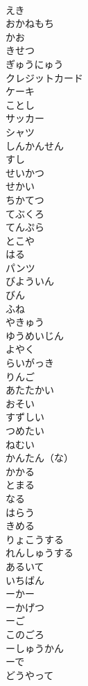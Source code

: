 \documentclass[8pt]{extreport}
\begin{document}
\begin{CJK}{UTF8}{min}
\\	えき	
\\	おかねもち	
\\	かお	
\\	きせつ	
\\	ぎゅうにゅう	
\\	クレジットカード	
\\	ケーキ	
\\	ことし	
\\	サッカー	
\\	シャツ	
\\	しんかんせん	
\\	すし	
\\	せいかつ	
\\	せかい	
\\	ちかてつ	
\\	てぶくろ	
\\	てんぷら	
\\	とこや	
\\	はる	
\\	パンツ	
\\	びよういん	
\\	びん	
\\	ふね	
\\	やきゅう	
\\	ゆうめいじん	
\\	よやく	
\\	らいがっき	
\\	りんご	
\\	あたたかい	
\\	おそい	
\\	すずしい	
\\	つめたい	
\\	ねむい	
\\	かんたん（な）	
\\	かかる	
\\	とまる	
\\	なる	
\\	はらう	
\\	きめる	
\\	りょこうする	
\\	れんしゅうする	
\\	あるいて	
\\	いちばん	
\\	ーかー	
\\	ーかげつ	
\\	ーご	
\\	このごろ	
\\	ーしゅうかん	
\\	ーで	
\\	どうやって	

\end{CJK}
\end{document}
